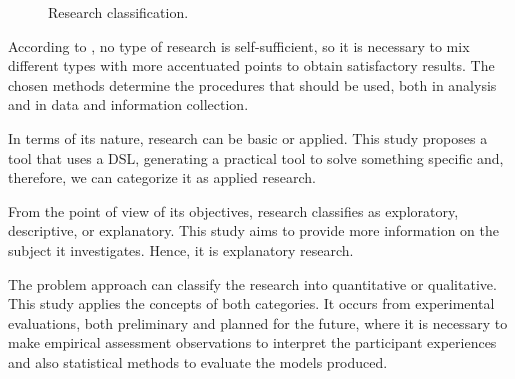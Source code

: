 \begin{figure}[!htb]
    \centering
    \caption{Research classification.}
    
    \label{fig:ResearchClassification}
\end{figure}

According to \cite{Prodanov:2013}, no type of research is self-sufficient, so it is necessary to mix different types with more accentuated points to obtain satisfactory results.
The chosen methods determine the procedures that should be used, both in analysis and in data and information collection.

In terms of its nature, research can be basic or applied.
This study proposes a tool that uses a DSL, generating a practical tool to solve something specific and, therefore, we can categorize it as applied research.

From the point of view of its objectives, research classifies as exploratory, descriptive, or explanatory. This study aims to provide more information on the subject it investigates. Hence, it is explanatory research.

The problem approach can classify the research into quantitative or qualitative.
This study applies the concepts of both categories.
It occurs from experimental evaluations, both preliminary and planned for the future, where it is necessary to make empirical assessment observations to interpret the participant experiences and also statistical methods to evaluate the models produced.

